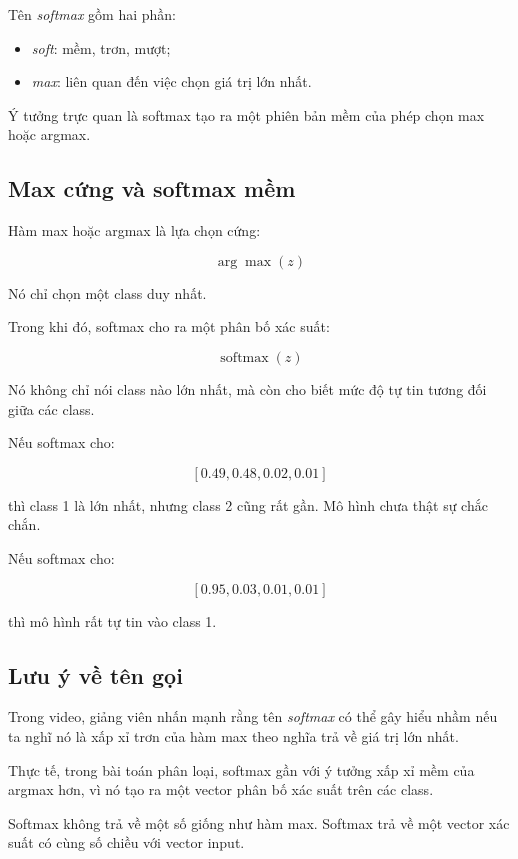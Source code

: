 Tên \textit{softmax} gồm hai phần:

\begin{itemize}
    \item \textit{soft}: mềm, trơn, mượt;
    \item \textit{max}: liên quan đến việc chọn giá trị lớn nhất.
\end{itemize}

Ý tưởng trực quan là softmax tạo ra một phiên bản mềm của phép chọn max hoặc argmax.

\subsection{Max cứng và softmax mềm}

Hàm max hoặc argmax là lựa chọn cứng:

\[
    \arg\max(z)
\]

Nó chỉ chọn một class duy nhất.

Trong khi đó, softmax cho ra một phân bố xác suất:

\[
    \operatorname{softmax}(z)
\]

Nó không chỉ nói class nào lớn nhất, mà còn cho biết mức độ tự tin tương đối giữa các class.

\begin{vidu}
Nếu softmax cho:

\[
    [0.49, 0.48, 0.02, 0.01]
\]

thì class 1 là lớn nhất, nhưng class 2 cũng rất gần. Mô hình chưa thật sự chắc chắn.

Nếu softmax cho:

\[
    [0.95, 0.03, 0.01, 0.01]
\]

thì mô hình rất tự tin vào class 1.
\end{vidu}

\subsection{Lưu ý về tên gọi}

Trong video, giảng viên nhấn mạnh rằng tên \textit{softmax} có thể gây hiểu nhầm nếu ta nghĩ nó là xấp xỉ trơn của hàm max theo nghĩa trả về giá trị lớn nhất.

Thực tế, trong bài toán phân loại, softmax gần với ý tưởng xấp xỉ mềm của argmax hơn, vì nó tạo ra một vector phân bố xác suất trên các class.

\begin{luuy}
Softmax không trả về một số giống như hàm max. Softmax trả về một vector xác suất có cùng số chiều với vector input.
\end{luuy}

